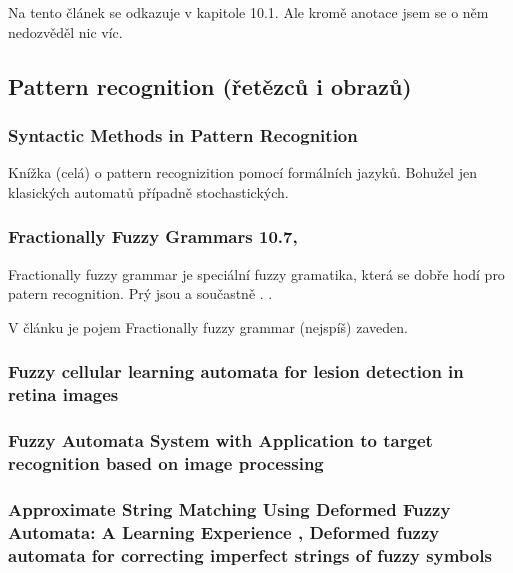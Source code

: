 \documentclass[a4paper,10pt]{article}
\begin{document}
Na tento článek se odkazuje \cite{MorMal-FuzzAutAndLangs} v kapitole 10.1. Ale kromě anotace jsem se o něm nedozvěděl nic víc.


\subsection{Pattern recognition (řetězců i obrazů)}


\subsubsection*{Syntactic Methods in Pattern Recognition \cite{Fu-SynMethPattRec}}

Knížka (celá) o pattern recognizition pomocí formálních jazyků. Bohužel jen klasických automatů případně stochastických.


\subsubsection*{Fractionally Fuzzy Grammars \cite{MorMal-FuzzAutAndLangs} 10.7, \cite{PalYau-FracFuzzGramAppPatRec}}

Fractionally fuzzy grammar je speciální fuzzy gramatika, která se dobře hodí pro patern recognition. Prý jsou  a součastně . .

V článku \cite{PalYau-FracFuzzGramAppPatRec} je pojem Fractionally fuzzy grammar (nejspíš) zaveden.

\subsubsection*{Fuzzy cellular learning automata for lesion detection in retina images \cite{NejAzaAdeMohMir-FuzzCellLeaAutLesDetRetIma}}
\subsubsection*{Fuzzy Automata System with Application to target recognition based on image processing \cite{WuaPanHan-FuzzAutSysAppTarRecBasImaProc}}
\subsubsection*{Approximate String Matching Using Deformed Fuzzy Automata: A Learning Experience \cite{AstGariGonVillFar-ApprStrMatUsiDefFuzzAutLearExpr}, Deformed fuzzy automata for correcting imperfect strings of fuzzy symbols \cite{GarMenEchAstFar-DefFuzzAutCorImpStrFuzzSyms}}
\end{document}
